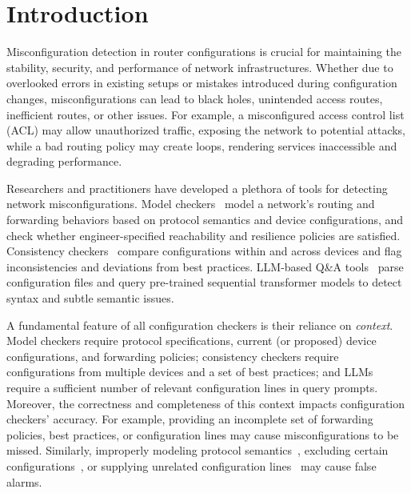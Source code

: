
\section{Introduction}
\label{sec:intro}

Misconfiguration detection in router configurations is crucial for maintaining the stability, security, and performance of network infrastructures. Whether due to overlooked errors in existing setups or mistakes introduced during configuration changes, misconfigurations can lead to black holes, unintended access routes, inefficient routes, or other issues. %
For example, a misconfigured access control list (ACL) may allow unauthorized traffic, exposing the network to potential attacks, while a bad routing policy may create loops, rendering services inaccessible and degrading performance.

Researchers and practitioners have developed a plethora of tools for detecting network misconfigurations. Model checkers~\cite{fogel2015general, beckett2017general, abhashkumar2020tiramisu, prabhu2020plankton, zhang2022sre, steffen2020netdice, ye2020hoyan, ritchey2000using,al2011configchecker, jeffrey2009model} model a network's routing and forwarding behaviors based on protocol semantics and device configurations, and check whether engineer-specified reachability and resilience policies are satisfied. Consistency checkers~\cite{kakarla2024diffy, kakarla2020finding, le2006minerals, feamster2005detecting, tang2021campion,le2008detecting,le2006characterization} compare configurations within and across devices and flag inconsistencies and deviations from best practices. LLM-based Q\&A tools~\cite{bogdanov2024leveraging,chen2024automatic,wang2024identifying,liu2024large, wang2024netconfeval, lian2023configuration} parse configuration files and query pre-trained sequential transformer models to detect syntax and subtle semantic issues.

A fundamental feature of all configuration checkers is their reliance on {\em context}. Model checkers require protocol specifications, current (or proposed) device configurations, and forwarding policies; consistency checkers require configurations from multiple devices and a set of best practices; and LLMs require a sufficient number of relevant configuration lines in query prompts. Moreover, the correctness and completeness of this context impacts configuration checkers' accuracy. For example, providing an incomplete set of forwarding policies, best practices, or configuration lines
may cause misconfigurations to be missed. Similarly, improperly modeling protocol semantics~\cite{birkner2021metha, ye2020hoyan}, excluding certain configurations~\cite{xu2023netcov}, or supplying unrelated configuration lines~\cite{liskavets2024prompt,tian2024examining,khurana2024and, shvartzshnaider2024llm} may cause false alarms.

